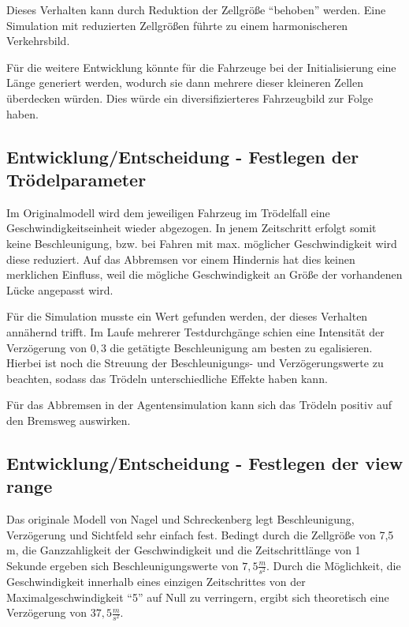 Dieses Verhalten kann durch Reduktion der Zellgröße \enquote{behoben} werden.
Eine Simulation mit reduzierten Zellgrößen führte zu einem harmonischeren Verkehrsbild.

Für die weitere Entwicklung könnte für die Fahrzeuge bei der Initialisierung eine Länge generiert werden, wodurch sie dann mehrere dieser kleineren Zellen überdecken würden.
Dies würde ein diversifizierteres Fahrzeugbild zur Folge haben.



\subsection{Entwicklung/Entscheidung - Festlegen der Trödelparameter}
\label{sec:lingersweetspot}

Im Originalmodell wird dem jeweiligen Fahrzeug im Trödelfall eine Geschwindigkeitseinheit wieder abgezogen. 
In jenem Zeitschritt erfolgt somit keine Beschleunigung, bzw. bei Fahren mit max. möglicher Geschwindigkeit wird diese reduziert. 
Auf das Abbremsen vor einem Hindernis hat dies keinen merklichen Einfluss, weil die mögliche Geschwindigkeit an Größe der vorhandenen Lücke angepasst wird.

Für die Simulation musste ein Wert gefunden werden, der dieses Verhalten annähernd trifft.
Im Laufe mehrerer Testdurchgänge schien eine Intensität der Verzögerung von $0,3$ die getätigte Beschleunigung am besten zu egalisieren. 
Hierbei ist noch die Streuung der Beschleunigungs- und Verzögerungswerte zu beachten, sodass das Trödeln unterschiedliche Effekte haben kann.

Für das Abbremsen in der Agentensimulation kann sich das Trödeln positiv auf den Bremsweg auswirken.



\subsection{Entwicklung/Entscheidung - Festlegen der view range}

Das originale Modell von Nagel und Schreckenberg legt Beschleunigung, Verzögerung und Sichtfeld sehr einfach fest.
Bedingt durch die Zellgröße von 7,5 m, die Ganzzahligkeit der Geschwindigkeit und die Zeitschrittlänge von 1 Sekunde ergeben sich Beschleunigungswerte von $7,5 \frac{m}{s^{2}}$. 
Durch die Möglichkeit, die Geschwindigkeit innerhalb eines einzigen Zeitschrittes von der Maximalgeschwindigkeit \enquote{5} auf Null zu verringern, ergibt sich theoretisch eine Verzögerung von $37,5 \frac{m}{s^{2}}$.

